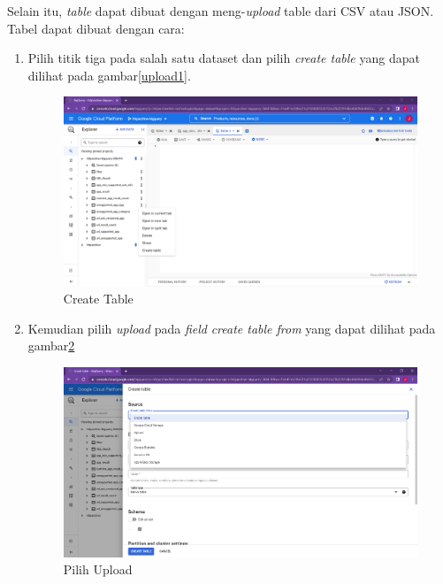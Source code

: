 Selain itu, \textit{table} dapat dibuat dengan meng-\textit{upload} table dari CSV atau JSON. Tabel dapat dibuat dengan cara:
\begin{enumerate}
	\item Pilih titik tiga pada salah satu dataset dan pilih \textit{create table} yang dapat dilihat pada gambar\ref{upload1}.
	\begin{figure}[H]
		\centering  
		\includegraphics[scale=0.35]{Gambar/upload_step_1.png}  
		\caption{Create Table} 
		\label{fig:upload1}
	\end{figure}

	\item Kemudian pilih \textit{upload} pada \textit{field} \textit{create table from} yang dapat dilihat pada gambar\ref{fig:upload2}
	\begin{figure}[H]
		\centering  
		\includegraphics[scale=0.35]{Gambar/upload_step_2.png}  
		\caption{Pilih Upload} 
		\label{fig:upload2}
	\end{figure}


\end{enumerate}
